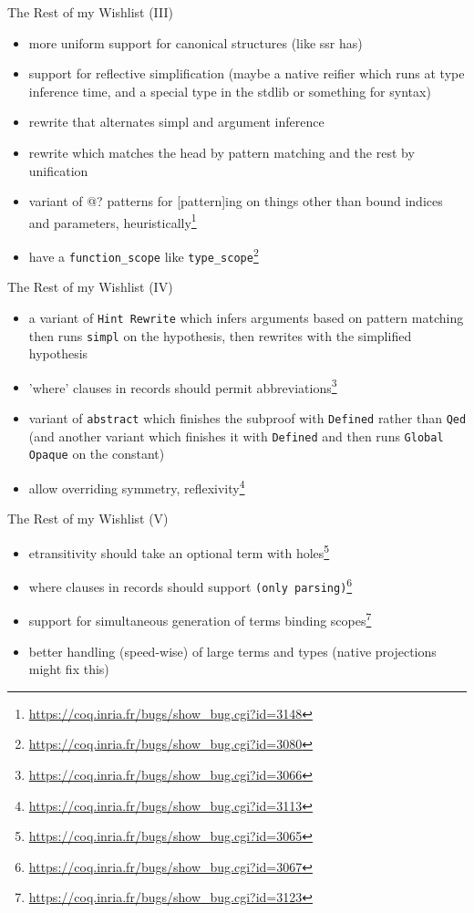 \documentclass{beamer}
\begin{document}
\begin{frame}{The Rest of my Wishlist (III)}
\begin{itemize}
  \item 
    more uniform support for canonical structures (like ssr has)
  \item 
    support for reflective simplification (maybe a native reifier which runs at type inference time, and a special type in the stdlib or something for syntax)
  \item 
    rewrite that alternates simpl and argument inference
  \item 
    rewrite which matches the head by pattern matching and the rest by unification
  \item 
    variant of @? patterns for [pattern]ing on things other than bound indices and parameters, heuristically\footnote{\url{https://coq.inria.fr/bugs/show\_bug.cgi?id=3148}}
  \item 
    have a \texttt{function\_scope} like \texttt{type\_scope}\footnote{\url{https://coq.inria.fr/bugs/show\_bug.cgi?id=3080}}
\end{itemize}
\end{frame}

\begin{frame}{The Rest of my Wishlist (IV)}
\begin{itemize}
  \item 
    a variant of \texttt{Hint Rewrite} which infers arguments based on pattern matching then runs \texttt{simpl} on the hypothesis, then rewrites with the simplified hypothesis
  \item 
    'where' clauses in records should permit abbreviations\footnote{\url{https://coq.inria.fr/bugs/show\_bug.cgi?id=3066}}
  \item 
    variant of \texttt{abstract} which finishes the subproof with \texttt{Defined} rather than \texttt{Qed} (and another variant which finishes it with \texttt{Defined} and then runs \texttt{Global Opaque} on the constant)
  \item 
    allow overriding symmetry, reflexivity\footnote{\url{https://coq.inria.fr/bugs/show\_bug.cgi?id=3113}}
\end{itemize}
\end{frame}

\begin{frame}{The Rest of my Wishlist (V)}
\begin{itemize}
  \item 
    etransitivity should take an optional term with holes\footnote{\url{https://coq.inria.fr/bugs/show\_bug.cgi?id=3065}}
  \item 
    where clauses in records should support \texttt{(only parsing)}\footnote{\url{https://coq.inria.fr/bugs/show\_bug.cgi?id=3067}}
  \item 
    support for simultaneous generation of terms binding scopes\footnote{\url{https://coq.inria.fr/bugs/show\_bug.cgi?id=3123}}
  \item 
    better handling (speed-wise) of large terms and types (native projections might fix this)
\end{itemize}
\end{frame}
\end{document}
